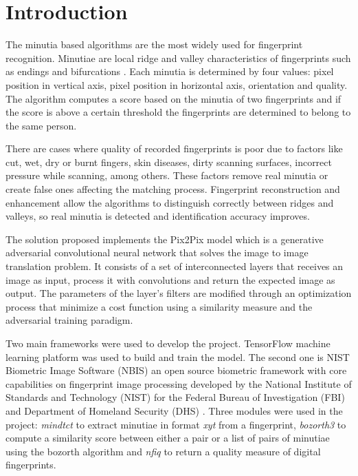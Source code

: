 \documentclass[a4paper,fleqn]{cas-dc}
\begin{document}
\section{Introduction}

The minutia based algorithms are the most widely used for fingerprint recognition. Minutiae are local ridge and valley characteristics of fingerprints such as endings and bifurcations \hyperref[sec:ref1]{\cite{b1}}. Each minutia is determined by four values: pixel position in vertical axis, pixel position in horizontal axis, orientation and quality\hyperref[sec:ref2]{\cite{b2}}. The algorithm computes a score based on the minutia of two fingerprints and if the score is above a certain threshold the fingerprints are determined to belong to the same person.

There are cases where quality of recorded fingerprints is poor due to factors like cut, wet, dry or burnt fingers, skin diseases, dirty scanning surfaces, incorrect pressure while scanning, among others. These factors remove real minutia or create false ones affecting the matching process. Fingerprint reconstruction and enhancement allow the algorithms to distinguish correctly between ridges and valleys, so real minutia is detected and identification accuracy improves.

The solution proposed implements the Pix2Pix model which is a generative adversarial convolutional neural network that solves the image to image translation problem. It consists of a set of interconnected layers that receives an image as input, process it with convolutions and return the expected image as output. The parameters of the layer's filters are modified through an optimization process that minimize a cost function using a similarity measure and the adversarial training paradigm. 

Two main frameworks were used to develop the project. TensorFlow machine learning platform was used to build and train the model. The second one is NIST Biometric Image Software (NBIS) an open source biometric framework with core capabilities on fingerprint image processing developed by the National Institute of Standards and Technology (NIST) for the Federal Bureau of Investigation (FBI) and Department of Homeland Security (DHS) \hyperref[sec:ref5]{\cite{b5}}. Three modules were used in the project: \textit{mindtct} to extract minutiae in format \textit{xyt} from a fingerprint, \textit{bozorth3} to compute a similarity score between either a pair or a list of pairs of minutiae using the bozorth algorithm and \textit{nfiq} to return a quality measure of digital fingerprints.
\end{document}
